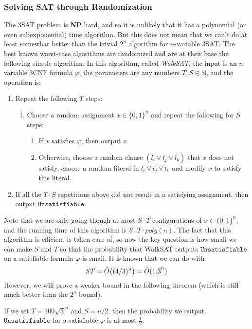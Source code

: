 \documentclass{article}
\begin{document}
  \subsubsection{Solving SAT through Randomization}
  The 3SAT problem is \textbf{NP} hard, and so it is unlikely that it has a polynomial (or even subexponential) time algorithm. But this does not mean that we can't do at least somewhat better than the trivial $2^n$ algorithm for $n$-variable 3SAT. The best known worst-case algorithms are randomized and are at their base the following simple algorithm. In this algorithm, called \textit{WalkSAT}, the input is an $n$ variable 3CNF formula $\varphi$, the parameters are any numbers $T, S \in \mathbb{N}$, and the operation is: 
  \begin{enumerate}
      \item Repeat the following $T$ steps: 
      \begin{enumerate}
          \item Choose a random assignment $x \in \{0,1\}^n$ and repeat the following for $S$ steps: 
          \begin{enumerate}
              \item If $x$ satisfies $\varphi$, then output $x$. 
              \item Otherwise, choose a random clause $(l_i \vee l_j \vee l_k)$ that $x$ does not satisfy, choose a random literal in $l_i \vee l_j \vee l_k$ and modify $x$ to satisfy this literal. 
          \end{enumerate}
      \end{enumerate}
      \item If all the $T \cdot S$ repetitions above did not result in a satisfying assignment, then output $\texttt{Unsatisfiable}$. 
  \end{enumerate}
  Note that we are only going though at most $S\cdot T$ configurations of $x \in \{0,1\}^n$, and the running time of this algorithm is $S \cdot T \cdot poly(n)$. The fact that this algorithm is efficient is taken care of, so now the key question is how small we can make $S$ and $T$ so that the probability that WalkSAT outputs $\texttt{Unsatisfiable}$ on a satisfiable formula $\varphi$ is small. It is known that we can do with 
  \[ST = \Tilde{O} \big( (4/3)^n \big) = \Tilde{O} ( 1.\overline{3}^n)\]
  However, we will prove a weaker bound in the following theorem (which is still much better than the $2^n$ bound). 

  \begin{theorem}
  If we set $T = 100\sqrt{3}^n$ and $S = n/2$, then the probability we output $\texttt{Unsatisfiable}$ for a satisfiable $\varphi$ is at most $\frac{1}{2}$. 
  \end{theorem}
\end{document}
